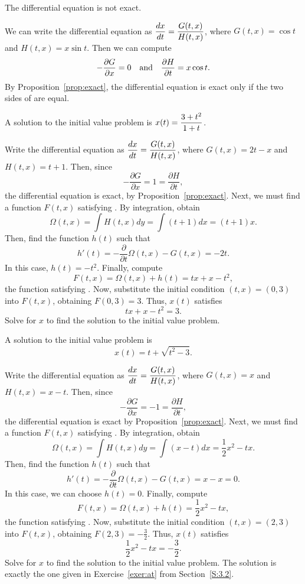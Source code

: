  \ans The differential equation is not exact.

\soln We can write the differential equation as $\displaystyle\frac{dx}{dt} =
\frac{G(t,x)}{H(t,x)}$, where $G(t,x) = \cos t$ and $H(t,x) = x\sin t$. 
Then we can compute
\[
-\frac{\partial G}{\partial x} = 0 \quad\mbox{and}\quad
\frac{\partial H}{\partial t} = x\cos t.
\]
By Proposition~\ref{prop:exact}, the differential equation is exact only
if the two sides of  are equal.

 \ans A solution to the initial value problem is
$x(t) = \displaystyle\frac{3 + t^2}{1 + t}$.

\soln Write the differential equation as $\displaystyle\frac{dx}{dt} =
\frac{G(t,x)}{H(t,x)}$, where $G(t,x) = 2t - x$ and $H(t,x) = t + 1$.  Then,
since
\[
-\frac{\partial G}{\partial x} = 1 = \frac{\partial H}{\partial t},
\]
the differential equation is exact, by
Proposition~\ref{prop:exact}.  Next, we must find a function $F(t,x)$
satisfying .  By integration, obtain
\[
\Omega(t,x) = \int H(t,x)dy = \int (t + 1)dx = (t + 1)x.
\]
Then, find the function $h(t)$ such that
\[
h'(t) = -\frac{\partial}{\partial t}\Omega(t,x) - G(t,x)
= -2t.
\]
In this case, $h(t) = -t^2$.  Finally, compute
\[
F(t,x) = \Omega(t,x) + h(t) = tx + x - t^2,
\]
the function satisfying .  Now, substitute the initial
condition $(t,x) = (0,3)$ into $F(t,x)$, obtaining $F(0,3) = 3$.  Thus,
$x(t)$ satisfies
\[
tx + x - t^2 = 3.
\]
Solve for $x$ to find the solution to the initial value problem.

 \ans A solution to the initial value problem is
\[
x(t) = t + \sqrt{t^2-3}.
\]

\soln Write the differential equation as $\displaystyle\frac{dx}{dt} =
\frac{G(t,x)}{H(t,x)}$, where $G(t,x) = x$ and $H(t,x) = x - t$.  Then,
since
\[
-\frac{\partial G}{\partial x} = -1 = \frac{\partial H}{\partial t},
\]
the differential equation is exact by Proposition~\ref{prop:exact}.  Next,
we must find a function $F(t,x)$ satisfying .  By integration,
obtain
\[
\Omega(t,x) = \int H(t,x)dy = \int (x - t)dx = \frac{1}{2}x^2 -tx.
\]
Then, find the function $h(t)$ such that
\[
h'(t) = -\frac{\partial}{\partial t}\Omega(t,x) - G(t,x)
= x - x = 0 .
\]
In this case, we can choose $h(t) = 0$.  Finally, compute
\[
F(t,x) = \Omega(t,x) + h(t) =  \frac{1}{2}x^2 -tx,
\]
the function satisfying .  Now, substitute the initial
condition $(t,x) = (2,3)$ into $F(t,x)$, obtaining $F(2,3) = -\frac{3}{2}$.  Thus,
$x(t)$ satisfies
\[
 \frac{1}{2}x^2 -tx = -\frac{3}{2}.
\]
Solve for $x$ to find the solution to the initial value problem.  The
solution is exactly the one given in Exercise~\ref{exer:at} from
Section~\ref{S:3.2}.


